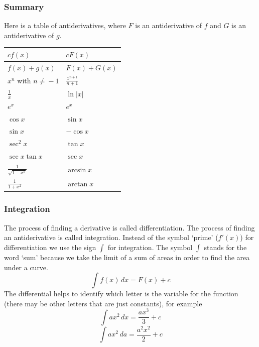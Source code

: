 \documentclass[xcolor=dvipsnames]{beamer}
\begin{document}
\begin{frame}
  \frametitle{Summary}
Here is a table of antiderivatives, where $F$ is an antiderivative of
$f$ and $G$ is an antiderivative of $g$.

\medskip

\begin{tabular}{|l|l|}\hline
  $cf(x)$ & $cF(x)$ \\ \hline
  $f(x)+g(x)$ & $F(x)+G(x)$ \\ \hline
  $x^{n}$ with $n\neq{}-1$ & $\displaystyle \frac{x^{n+1}}{n+1}$ \\ \hline
  $\displaystyle \frac{1}{x}$ & $\ln\vert{}x\vert$ \\ \hline
  $e^{x}$ & $e^{x}$ \\ \hline
  $\cos{}x$ & $\sin{}x$ \\ \hline
  $\sin{}x$ & $-\cos{}x$ \\ \hline
  $\sec^{2}x$ & $\tan{}x$ \\ \hline
  $\sec{}x\tan{}x$ & $\sec{}x$ \\ \hline
  $\displaystyle \frac{1}{\sqrt{1-x^{2}}}$ & $\arcsin{}x$ \\ \hline
  $\displaystyle \frac{1}{1+x^{2}}$ & $\arctan{}x$ \\ \hline
\end{tabular}
\end{frame}

\begin{frame}
  \frametitle{Integration}
  The process of finding a derivative is called differentiation. The
  process of finding an antiderivative is called \alert{integration}.
  Instead of the symbol `prime' ($f'(x)$) for differentiation we use
  the sign $\int$ for integration. The symbol $\int$ stands for the
  word `sum' because we take the limit of a sum of areas in order to
  find the area under a curve.
\begin{equation}
  \label{eq:muixutoh}
  \int{}f(x)\,dx=F(x)+c
\end{equation}
The differential helps to identify which letter is the variable for
the function (there may be other letters that are just constants), for
example
\begin{equation}
  \label{eq:eighooko}
  \int{}ax^{2}\,dx=\frac{ax^{3}}{3}+c
\end{equation}
\begin{equation}
  \label{eq:ungiumah}
  \int{}ax^{2}\,da=\frac{a^{2}x^{2}}{2}+c
\end{equation}
\end{frame}
\end{document}
